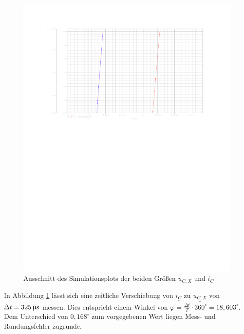 \documentclass[11pt]{scrartcl}
\begin{document}
\begin{figure}[!htb]
    \begin{center}
      \includegraphics[width=\linewidth]{./Assets/PS_Plot.pdf}
    \caption{Ausschnitt des Simulationsplots der beiden Größen $u_{C,X}$ und $i_{C}$}
    \label{fig:simulation}
  \end{center}
\end{figure}

In Abbildung \ref{fig:simulation} lässt sich eine zeitliche Verschiebung von $\underline{i_{C}}$ zu $\underline{u_{C,X}}$ von $\Delta t = 325 \,\text{$\upmu$s}$ messen.
Dies entspricht einem Winkel von $\varphi = \frac{\Delta t}{T} \cdot 360^{\circ} = 18,603^{\circ}$. Dem Unterschied von $0,168^{\circ}$ zum vorgegebenen Wert liegen Mess- und Rundungsfehler zugrunde.
\end{document}
